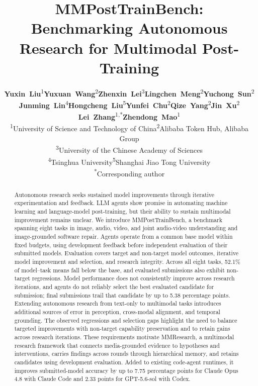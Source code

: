 \documentclass{article}
\title{MMPostTrainBench: Benchmarking Autonomous Research for Multimodal Post-Training}
\author{%
  \begin{minipage}{\dimexpr\textwidth-2\tabcolsep\relax}
  \raggedright\normalfont\normalsize
  \mbox{\textbf{Yuxin Liu}\textsuperscript{1}}\quad \mbox{\textbf{Yuxuan Wang}\textsuperscript{2}}\quad \mbox{\textbf{Zhenxin Lei}\textsuperscript{3}}\quad \mbox{\textbf{Lingchen Meng}\textsuperscript{2}}\quad \mbox{\textbf{Yuchong Sun}\textsuperscript{2}} \\[2pt]
  \mbox{\textbf{Junming Lin}\textsuperscript{4}}\quad \mbox{\textbf{Hongcheng Liu}\textsuperscript{5}}\quad \mbox{\textbf{Yunfei Chu}\textsuperscript{2}}\quad \mbox{\textbf{Qize Yang}\textsuperscript{2}}\quad \mbox{\textbf{Jin Xu}\textsuperscript{2}} \\[2pt]
  \mbox{\textbf{Lei Zhang}\textsuperscript{1,*}}\quad \mbox{\textbf{Zhendong Mao}\textsuperscript{1}} \\[5pt]
  \textsuperscript{1}University of Science and Technology of China\quad\textsuperscript{2}Alibaba Token Hub, Alibaba Group\\[2pt]
  \textsuperscript{3}University of the Chinese Academy of Sciences\\[2pt]
  \textsuperscript{4}Tsinghua University\quad\textsuperscript{5}Shanghai Jiao Tong University\\[2pt]
  \textsuperscript{*}Corresponding author
  \end{minipage}%
}
\newcommand{\benchmark}{MMPostTrainBench}
\newcommand{\harness}{\mbox{MMResearch}}
\begin{document}
\raggedbottom
\maketitle
\vspace{-8pt}
\begin{abstract}
Autonomous research seeks sustained model improvements through iterative experimentation and feedback. LLM agents show promise in automating machine learning and language-model post-training, but their ability to sustain multimodal improvement remains unclear. We introduce \benchmark{}, a benchmark spanning eight tasks in image, audio, video, and joint audio-video understanding and image-grounded software repair. Agents operate from a common base model within fixed budgets, using development feedback before independent evaluation of their submitted models. Evaluation covers target and non-target model outcomes, iterative model improvement and selection, and research integrity. Across all eight tasks, 52.1\% of model--task means fall below the base, and evaluated submissions also exhibit non-target regressions. Model performance does not consistently improve across research iterations, and agents do not reliably select the best evaluated candidate for submission; final submissions trail that candidate by up to 5.38 percentage points. Extending autonomous research from text-only to multimodal tasks introduces additional sources of error in perception, cross-modal alignment, and temporal grounding. The observed regressions and selection gaps highlight the need to balance targeted improvements with non-target capability preservation and to retain gains across research iterations. These requirements motivate \harness{}, a multimodal research framework that connects media-grounded evidence to hypotheses and interventions, carries findings across rounds through hierarchical memory, and retains candidates using development evaluation. Added to existing code-agent runtimes, it improves submitted-model accuracy by up to 7.75 percentage points for Claude Opus 4.8 with Claude Code and 2.33 points for GPT-5.6-sol with Codex.
\end{abstract}
\begingroup
\setlength{\intextsep}{5pt}

\endgroup
{}
%
\begingroup
{}
  {\PackageError{mile}{Introduction heading spacing patch failed}{Check the current section definition.}}

\par
\endgroup






\clearpage
\appendix

\end{document}

